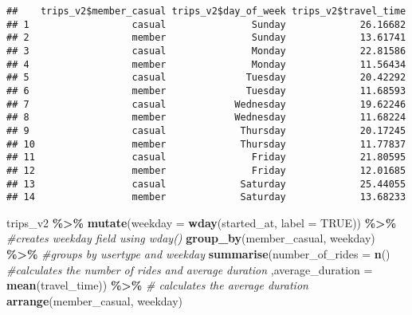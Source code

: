 \documentclass[
]{article}
\newenvironment{Shaded}{\begin{snugshade}}{\end{snugshade}}
\newcommand{\AttributeTok}[1]{\textcolor[rgb]{0.13,0.29,0.53}{#1}}
\newcommand{\CommentTok}[1]{\textcolor[rgb]{0.56,0.35,0.01}{\textit{#1}}}
\newcommand{\ConstantTok}[1]{\textcolor[rgb]{0.56,0.35,0.01}{#1}}
\newcommand{\FunctionTok}[1]{\textcolor[rgb]{0.13,0.29,0.53}{\textbf{#1}}}
\newcommand{\NormalTok}[1]{#1}
\newcommand{\SpecialCharTok}[1]{\textcolor[rgb]{0.81,0.36,0.00}{\textbf{#1}}}
\begin{document}
\begin{verbatim}
##    trips_v2$member_casual trips_v2$day_of_week trips_v2$travel_time
## 1                  casual               Sunday             26.16682
## 2                  member               Sunday             13.61741
## 3                  casual               Monday             22.81586
## 4                  member               Monday             11.56434
## 5                  casual              Tuesday             20.42292
## 6                  member              Tuesday             11.68593
## 7                  casual            Wednesday             19.62246
## 8                  member            Wednesday             11.68224
## 9                  casual             Thursday             20.17245
## 10                 member             Thursday             11.77837
## 11                 casual               Friday             21.80595
## 12                 member               Friday             12.01685
## 13                 casual             Saturday             25.44055
## 14                 member             Saturday             13.68233
\end{verbatim}

\begin{Shaded}
\begin{Highlighting}[]
\NormalTok{trips\_v2 }\SpecialCharTok{\%\textgreater{}\%} 
  \FunctionTok{mutate}\NormalTok{(}\AttributeTok{weekday =} \FunctionTok{wday}\NormalTok{(started\_at, }\AttributeTok{label =} \ConstantTok{TRUE}\NormalTok{)) }\SpecialCharTok{\%\textgreater{}\%}  \CommentTok{\#creates weekday field using wday()}
  \FunctionTok{group\_by}\NormalTok{(member\_casual, weekday) }\SpecialCharTok{\%\textgreater{}\%}                  \CommentTok{\#groups by usertype and weekday}
  \FunctionTok{summarise}\NormalTok{(}\AttributeTok{number\_of\_rides =} \FunctionTok{n}\NormalTok{()                                     }\CommentTok{\#calculates the number of rides and average duration }
\NormalTok{  ,}\AttributeTok{average\_duration =} \FunctionTok{mean}\NormalTok{(travel\_time)) }\SpecialCharTok{\%\textgreater{}\%}                \CommentTok{\# calculates the average duration}
  \FunctionTok{arrange}\NormalTok{(member\_casual, weekday)           }
\end{Highlighting}
\end{Shaded}
\end{document}
